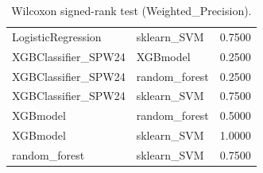 \begin{table}[t]
\begin{tabular}{llr}
LogisticRegression & sklearn_SVM & 0.7500 \\
XGBClassifier_SPW24 & XGBmodel & 0.2500 \\
XGBClassifier_SPW24 & random_forest & 0.2500 \\
XGBClassifier_SPW24 & sklearn_SVM & 0.7500 \\
XGBmodel & random_forest & 0.5000 \\
XGBmodel & sklearn_SVM & 1.0000 \\
random_forest & sklearn_SVM & 0.7500 \\
\bottomrule
\end{tabular}
\caption{Wilcoxon signed-rank test (Weighted_Precision).}
\label{tab:wilcoxon_Weighted_Precision}
\end{table}